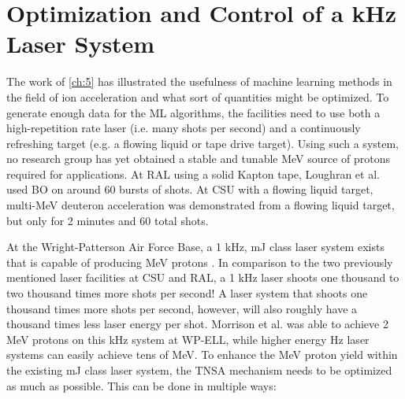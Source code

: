 \chapter{Optimization and Control of a kHz Laser System} \label{ch:6}

The work of \autoref{ch:5} has illustrated the usefulness of machine learning methods in the field of ion acceleration and what sort of quantities might be optimized. To generate enough data for the \gls{ML} algorithms, the facilities need to use both a high-repetition rate laser (i.e. many shots per second) and a continuously refreshing target (e.g. a flowing liquid or tape drive target). Using such a system, no research group has yet obtained a stable and tunable MeV source of protons required for applications. At \gls{RAL} using a solid Kapton tape, Loughran et al. \cite{Loughran_2023_HPLSE} used \gls{BO} on around 60 bursts of shots. At \gls{CSU} with a flowing liquid target, multi-MeV deuteron acceleration \cite{Treffert_2022_APL} was demonstrated from a flowing liquid target, but only for 2 minutes and 60 total shots.

At the Wright-Patterson Air Force Base, a 1 kHz, mJ class laser system exists that is capable of producing MeV protons \cite{Morrison_2018_NJoP}. In comparison to the two previously mentioned laser facilities at \gls{CSU} and \gls{RAL}, a 1 kHz laser shoots one thousand to two thousand times more shots per second! A laser system that shoots one thousand times more shots per second, however, will also roughly have a thousand times less laser energy per shot. Morrison et al. \cite{Morrison_2018_NJoP} was able to achieve 2 MeV protons on this kHz system at \gls{WP-ELL}, while higher energy Hz laser systems can easily achieve tens of MeV. To enhance the MeV proton yield within the existing mJ class laser system, the \gls{TNSA} mechanism needs to be optimized as much as possible. This can be done in multiple ways:

